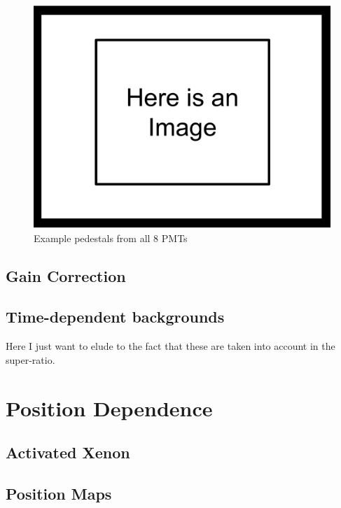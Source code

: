 \begin{figure}[h] \label{fig:peds_timeDep}
\centering
\includegraphics[scale=.25]{3-UCNAAnalysis/ImageHolder.pdf}
\caption{Example pedestals from all 8 PMTs}
\end{figure}

\subsection{Gain Correction}

\subsection{Time-dependent backgrounds}
Here I just want to elude to the fact that these are taken into account in
the super-ratio.


\section{Position Dependence}

\subsection{Activated Xenon}


\subsection{Position Maps}


